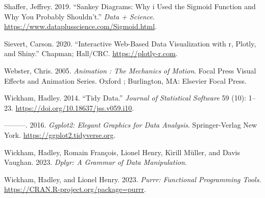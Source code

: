 \begin{CSLReferences}{1}{0}
\leavevmode{}%
Shaffer, Jeffrey. 2019. {``Sankey Diagrams: Why i Used the Sigmoid Function and Why You Probably Shouldn't.''} \emph{Data + Science}. \url{https://www.dataplusscience.com/Sigmoid.html}.

\leavevmode{}%
Sievert, Carson. 2020. {``Interactive {Web-Based} Data Visualization with r, Plotly, and Shiny.''} Chapman; Hall/CRC. \url{https://plotly-r.com}.

\leavevmode{}%
Webster, Chris. 2005. \emph{Animation : The Mechanics of Motion}. Focal Press Visual Effects and Animation Series. Oxford ; Burlington, MA: Elsevier Focal Press.

\leavevmode{}%
Wickham, Hadley. 2014. {``Tidy Data.''} \emph{Journal of Statistical Software} 59 (10): 1--23. \url{https://doi.org/10.18637/jss.v059.i10}.

\leavevmode{}%
---------. 2016. \emph{Ggplot2: Elegant Graphics for Data Analysis}. Springer-Verlag New York. \url{https://ggplot2.tidyverse.org}.

\leavevmode{}%
Wickham, Hadley, Romain François, Lionel Henry, Kirill Müller, and Davis Vaughan. 2023. \emph{Dplyr: A Grammar of Data Manipulation}.

\leavevmode{}%
Wickham, Hadley, and Lionel Henry. 2023. \emph{Purrr: Functional Programming Tools}. \url{https://CRAN.R-project.org/package=purrr}.

\end{CSLReferences}



\address{%
Krisanat Anukarnsakulchularp\\
Monash University\\%
Department of Econometrics and Business Statistics\\ Melbourne, Australia\\
%
%
\textit{ORCiD: \href{https://orcid.org/0009-0008-5638-7124}{0009-0008-5638-7124}}\\%
\href{mailto:kanu0003@student.monash.edu}{\nolinkurl{kanu0003@student.monash.edu}}%
}

\address{%
Dianne Cook\\
Monash University\\%
Department of Econometrics and Business Statistics\\ Melbourne, Australia\\
%
%
\textit{ORCiD: \href{https://orcid.org/0000-0002-3813-7155}{0000-0002-3813-7155}}\\%
\href{mailto:dicook@monash.edu}{\nolinkurl{dicook@monash.edu}}%
}
